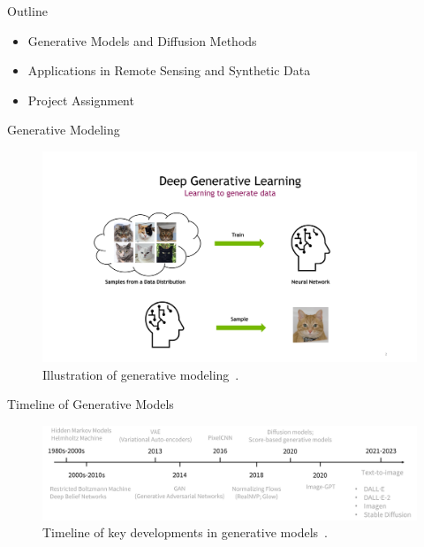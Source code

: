 
\begin{refsection}
  \begin{frame}{Outline}
    \begin{itemize}
      \item Generative Models and Diffusion Methods
      \item Applications in Remote Sensing and Synthetic Data
      \item Project Assignment
    \end{itemize}
  \end{frame}
\end{refsection}

\begin{refsection}
\begin{frame}{Generative Modeling}
  \begin{figure}
    \centering
    \includegraphics[width=0.8\linewidth]{figs/learning_to_generate_data.png}
    \caption{\scriptsize Illustration of generative modeling~\parencite{CVPR2023Tutorial}.}
  \end{figure}
  \bottomleftrefs
\end{frame}
\end{refsection}

\begin{refsection}
\begin{frame}{Timeline of Generative Models}
  \begin{figure}
    \centering
    \includegraphics[width=0.95\linewidth]{figs/genai_timeline.png}
    \caption{\scriptsize Timeline of key developments in generative models~\parencite{dengPPTAdvancedNueralNetwork2024}.}
  \end{figure}
  \bottomleftrefs
\end{frame}
\end{refsection}



